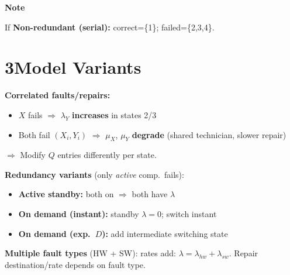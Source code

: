 \documentclass[10pt,a4paper]{article}
\begin{document}
\vspace{0.6em}
\begin{notebox}
  \textbf{Note}

  If \textbf{Non-redundant (serial):} correct=\{1\}; failed=\{2,3,4\}.
\end{notebox}

\vspace{3pt}

\section*{3\quad Model Variants}

\vspace{0pt}
\begin{minipage}[t]{0.48\textwidth}
\vspace{0pt}
\begin{keybox}
\textbf{Correlated faults/repairs:}
\begin{itemize}
  \item $X$ fails $\Rightarrow$ $\lambda_Y$ \textbf{increases} in states 2/3
  \item Both fail $(X_i,Y_i)$ $\Rightarrow$ $\mu_X$, $\mu_Y$ \textbf{degrade} (shared technician, slower repair)
\end{itemize}
$\Rightarrow$ Modify $Q$ entries differently per state.
\end{keybox}
\end{minipage}\hfill
\begin{minipage}[t]{0.48\textwidth}
\vspace{0pt}
\begin{defbox}
\textbf{Redundancy variants} (only \emph{active} comp.\ fails):
\begin{itemize}
  \item \textbf{Active standby:} both on $\Rightarrow$ both have $\lambda$
  \item \textbf{On demand (instant):} standby $\lambda{=}0$; switch instant
  \item \textbf{On demand (exp.\ $D$):} add intermediate switching state
\end{itemize}
\textbf{Multiple fault types} (HW + SW): rates add: $\lambda{=}\lambda_{hw}{+}\lambda_{sw}$. Repair destination/rate depends on fault type.
\end{defbox}
\end{minipage}
\end{document}
